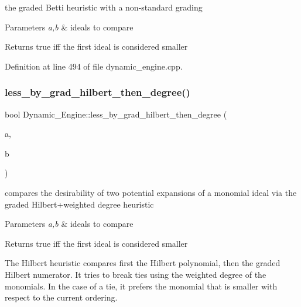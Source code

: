 the graded Betti heuristic with a non-\/standard grading 


\begin{DoxyParams}{Parameters}
{\em a,b} & ideals to compare \\
\hline
\end{DoxyParams}
\begin{DoxyReturn}{Returns}
{\ttfamily true} iff the first ideal is considered smaller 
\end{DoxyReturn}


Definition at line 494 of file dynamic\+\_\+engine.\+cpp.

\mbox{\label{namespace_dynamic___engine_a9a6525d0f50053349c5573422f025c22}} 
\subsubsection{\texorpdfstring{less\+\_\+by\+\_\+grad\+\_\+hilbert\+\_\+then\+\_\+degree()}{less\_by\_grad\_hilbert\_then\_degree()}}
{\footnotesize\ttfamily bool Dynamic\+\_\+\+Engine\+::less\+\_\+by\+\_\+grad\+\_\+hilbert\+\_\+then\+\_\+degree (\begin{DoxyParamCaption}\item[{\hyperlink{group___g_b_computation_class_dynamic___engine_1_1_p_p___with___ideal}{P\+P\+\_\+\+With\+\_\+\+Ideal} \&}]{a,  }\item[{\hyperlink{group___g_b_computation_class_dynamic___engine_1_1_p_p___with___ideal}{P\+P\+\_\+\+With\+\_\+\+Ideal} \&}]{b }\end{DoxyParamCaption})}



compares the desirability of two potential expansions of a monomial ideal via the graded Hilbert+weighted degree heuristic 


\begin{DoxyParams}{Parameters}
{\em a,b} & ideals to compare \\
\hline
\end{DoxyParams}
\begin{DoxyReturn}{Returns}
{\ttfamily true} iff the first ideal is considered smaller
\end{DoxyReturn}
The Hilbert heuristic compares first the Hilbert polynomial, then the graded Hilbert numerator. It tries to break ties using the weighted degree of the monomials. In the case of a tie, it prefers the monomial that is smaller with respect to the current ordering. 

